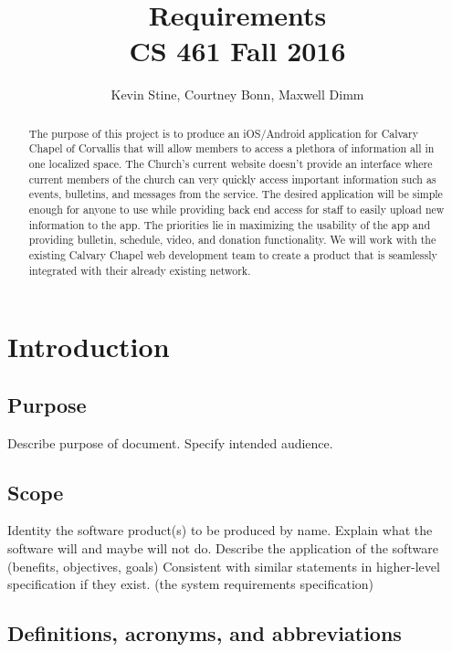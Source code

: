 \documentclass[letterpaper,10pt,draftclsnofoot,onecolumn,titlepage]{IEEEtran}
\def\name{Kevin Stine, Courtney Bonn, Maxwell Dimm}
\begin{document}
	\title{\huge Requirements \\ CS 461 Fall 2016}
	\author{\large \name}
	
	\maketitle
		\begin{abstract}The purpose of this project is to produce an iOS/Android application for Calvary Chapel of Corvallis that will allow members to access a plethora of information all in one localized space. 
		The Church's current website doesn't provide an interface where current members of the church can very quickly access important information such as events, bulletins, and messages from the service. 
		The desired application will be simple enough for anyone to use while providing back end access for staff to easily upload new information to the app. 
		The priorities lie in maximizing the usability of the app and providing bulletin, schedule, video, and donation functionality. 
		We will work with the existing Calvary Chapel web development team to create a product that is seamlessly integrated with their already existing network. 
		\end{abstract}
	
	\clearpage	
		
	\section{Introduction}
	\subsection{Purpose}
	Describe purpose of document.
	Specify intended audience.
	
	\subsection{Scope}
	Identity the software product(s) to be produced by name.
	Explain what the software will and maybe will not do. 
	Describe the application of the software (benefits, objectives, goals)
	Consistent with similar statements in higher-level specification if they exist. (the system requirements specification)
	
	\subsection{Definitions, acronyms, and abbreviations}
	
\end{document}
